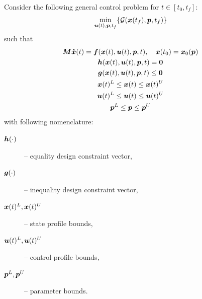 Consider the following general control problem for $t \in
[t_{0},t_{f}]$:
\begin{equation}
\min_{\ve{u}(t),\ve{p},t_f}\{\mf{G}(\ve{x}(t_f),\ve{p},t_f)\}
\label{eq:gencontprob} 
\end{equation}
such that
\begin{gather}
\ve{M\dot{x}}(t) = \ve{f}(\ve{x}(t),\ve{u}(t),\ve{p},t), \quad
\ve{x}(t_{0}) = \ve{x}_{0}(\ve{p})\nonumber\\  
\ve{h}(\ve{x}(t),\ve{u}(t),\ve{p},t) = \ve{0}\nonumber\\ 
\ve{g}(\ve{x}(t),\ve{u}(t),\ve{p},t) \leq \ve{0}\nonumber\\
\ve{x}(t)^{L} \leq \ve{x}(t) \leq \ve{x}(t)^{U}\nonumber\\ 
\ve{u}(t)^{L} \leq \ve{u}(t) \leq \ve{u}(t)^{U}\nonumber\\
\ve{p}^{L} \leq \ve{p} \leq \ve{p}^{U}\nonumber  
\end{gather}with following nomenclature:
\begin{description}
\item [$\ve{h}(\cdot)$] -- equality design constraint vector,
\item [$\ve{g}(\cdot)$] -- inequality design constraint vector,
\item [$\ve{x}(t)^{L},\ve{x}(t)^{U}$] -- state profile bounds, 
\item [$\ve{u}(t)^{L},\ve{u}(t)^{U}$] -- control profile bounds,
\item [$\ve{p}^{L},\ve{p}^{U}$] -- parameter bounds.
\end{description}

